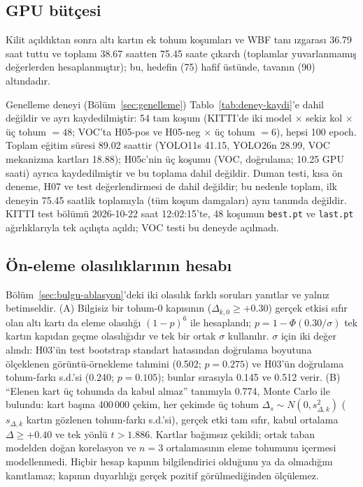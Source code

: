 \subsection{GPU bütçesi}\label{sec:ek-butce}
Kilit açıldıktan sonra altı kartın ek tohum koşumları ve WBF tanı ızgarası 36.79 saat tuttu ve toplamı 38.67 saatten 75.45 saate çıkardı (toplamlar yuvarlanmamış değerlerden hesaplanmıştır); bu, hedefin (75) hafif üstünde, tavanın (90) altındadır.

Genelleme deneyi (Bölüm~\ref{sec:genelleme}) Tablo~\ref{tab:deney-kaydi}'e dahil değildir ve ayrı kaydedilmiştir: 54 tam koşum (KITTI'de iki model $\times$ sekiz kol $\times$ üç tohum $=48$; VOC'ta H05-pos ve H05-neg $\times$ üç tohum $=6$), hepsi 100 epoch. Toplam eğitim süresi 89.02 saattir (YOLO11s 41.15, YOLO26n 28.99, VOC mekanizma kartları 18.88); H05c'nin üç koşumu (VOC, doğrulama; 10.25 GPU saati) ayrıca kaydedilmiştir ve bu toplama dahil değildir. Duman testi, kısa ön deneme, H07 ve test değerlendirmesi de dahil değildir; bu nedenle toplam, ilk deneyin 75.45 saatlik toplamıyla (tüm koşum damgaları) aynı tanımda değildir. KITTI test bölümü 2026-10-22 saat 12:02:15'te, 48 koşumun \texttt{best.pt} ve \texttt{last.pt} ağırlıklarıyla tek açılışta açıldı; VOC testi bu deneyde açılmadı.

\subsection{Ön-eleme olasılıklarının hesabı}\label{sec:ek-onele}
Bölüm~\ref{sec:bulgu-ablasyon}'deki iki olasılık farklı soruları yanıtlar ve yalnız betimseldir. (A) Bilgisiz bir tohum-0 kapısının ($\Delta_{k,0}\ge+0.30$) gerçek etkisi sıfır olan altı kartı da eleme olasılığı $(1-p)^6$ ile hesaplandı; $p=1-\Phi(0.30/\sigma)$ tek kartın kapıdan geçme olasılığıdır ve tek bir ortak $\sigma$ kullanılır. $\sigma$ için iki değer alındı: H03'ün test bootstrap standart hatasından doğrulama boyutuna ölçeklenen görüntü-örnekleme tahmini (0.502; $p=0.275$) ve H03'ün doğrulama tohum-farkı s.d.'si (0.240; $p=0.105$); bunlar sırasıyla 0.145 ve 0.512 verir. (B) ``Elenen kart üç tohumda da kabul almaz'' tanımıyla 0.774, Monte Carlo ile bulundu: kart başına 400\,000 çekim, her çekimde üç tohum $\Delta_s\sim N(0,s_{\Delta,k}^2)$ ($s_{\Delta,k}$ kartın gözlenen tohum-farkı s.d.'si), gerçek etki tam sıfır, kabul ortalama $\Delta\ge+0.40$ ve tek yönlü $t>1.886$. Kartlar bağımsız çekildi; ortak taban modelden doğan korelasyon ve $n=3$ ortalamasının eleme tohumunu içermesi modellenmedi. Hiçbir hesap kapının bilgilendirici olduğunu ya da olmadığını kanıtlamaz; kapının duyarlılığı gerçek pozitif görülmediğinden ölçülemez.

